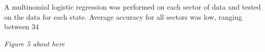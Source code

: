 A multinomial logistic regression was performed on each sector of data and tested on the data for each state. Average accuracy for all sectors was low, ranging between 34%

\textit{Figure 5 about here}


\endinput
